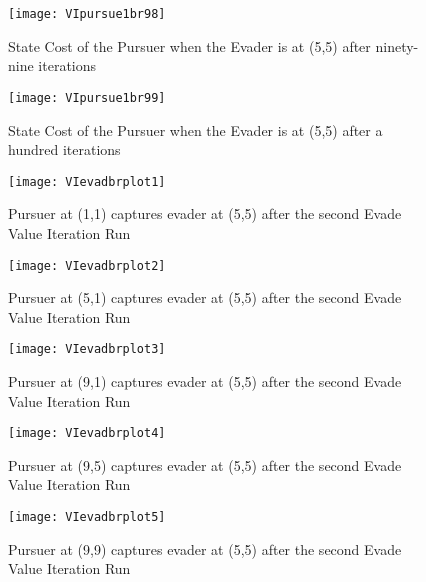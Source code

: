 \begin{figure}
\vspace{2.4in}
\centering
\texttt{[image: VIpursue1br98]}
\caption{State Cost of the Pursuer when the Evader is at (5,5) after ninety-nine iterations}
\label{VIpursue1br98}
\end{figure}
\clearpage
\newpage

\begin{figure}
\vspace{2.4in}
\centering
\texttt{[image: VIpursue1br99]}
\caption{State Cost of the Pursuer when the Evader is at (5,5) after a hundred iterations}
\label{VIpursue1br99}
\end{figure}
\clearpage
\newpage

\begin{figure}
\vspace{2.4in}
\centering
\texttt{[image: VIevadbrplot1]}
\caption{Pursuer at (1,1) captures evader at (5,5) after the second Evade Value Iteration Run}
\label{VIevadbrplot1}
\end{figure}
\clearpage
\newpage

\begin{figure}
\vspace{2.4in}
\centering
\texttt{[image: VIevadbrplot2]}
\caption{Pursuer at (5,1) captures evader at (5,5) after the second Evade Value Iteration Run}
\label{VIevadbrplot2}
\end{figure}
\clearpage
\newpage

\begin{figure}
\vspace{2.4in}
\centering
\texttt{[image: VIevadbrplot3]}
\caption{Pursuer at (9,1) captures evader at (5,5) after the second Evade Value Iteration Run}
\label{VIevadbrplot3}
\end{figure}
\clearpage
\newpage

\begin{figure}
\vspace{2.4in}
\centering
\texttt{[image: VIevadbrplot4]}
\caption{Pursuer at (9,5) captures evader at (5,5) after the second Evade Value Iteration Run}
\label{VIevadbrplot4}
\end{figure}
\clearpage
\newpage

\begin{figure}
\vspace{2.4in}
\centering
\texttt{[image: VIevadbrplot5]}
\caption{Pursuer at (9,9) captures evader at (5,5) after the second Evade Value Iteration Run}
\label{VIevadbrplot5}
\end{figure}
\clearpage
\newpage

